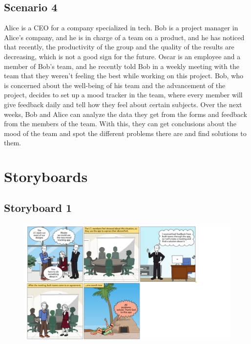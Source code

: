 \documentclass[11pt]{article}
\begin{document}
\subsection{Scenario 4}
Alice is a CEO for a company specialized in tech. Bob is a project manager in Alice’s company, and he is in charge of a team on a product, and he has noticed that recently, the productivity of the group and the quality of the results are decreasing, which is not a good sign for the future. Oscar is an employee and a member of Bob’s team, and he recently told Bob in a weekly meeting with the team that they weren’t feeling the best while working on this project. Bob, who is concerned about the well-being of his team and the advancement of the project, decides to set up a mood tracker in the team, where every member will give feedback daily and tell how they feel about certain subjects. Over the next weeks, Bob and Alice can analyze the data they get from the forms and feedback from the members of the team. With this, they can get conclusions about the mood of the team and spot the different problems there are and find solutions to them.
\clearpage

\section{Storyboards}
\subsection{Storyboard 1}
\begin{figure}[!h]
    \centering
    \includegraphics[scale = 0.5]{figures/Storyboard all.pdf}
\end{figure}
\end{document}
